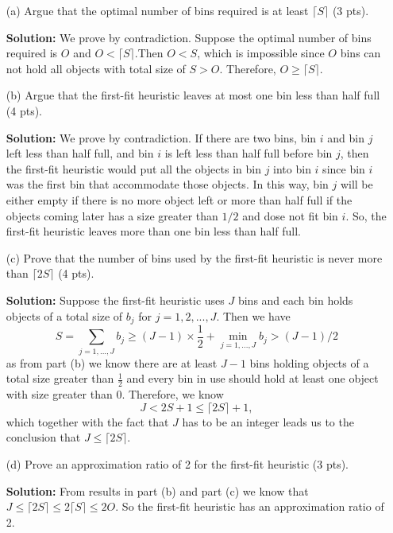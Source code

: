 \documentclass{article}
\begin{document}
\begin{itemize}
\item[(a)] Argue that the optimal number of bins required is at least $\lceil S \rceil$ (3 pts).
\begin{tcolorbox}
\textbf{Solution:} We prove by contradiction. Suppose the optimal number of bins required is $O$ and $O < \lceil S \rceil$.Then $O < S$, which is impossible since $O$ bins can not hold all objects with total size of $S > O$. Therefore, $O \geq \lceil S \rceil$.
\end{tcolorbox}

\item[(b)] Argue that the first-fit heuristic leaves at most one bin less than half full (4 pts).
\begin{tcolorbox}
\textbf{Solution:} We prove by contradiction. If there are two bins, bin $i$ and bin $j$ left less than half full, and bin $i$ is left less than half full before bin $j$, then the first-fit heuristic would put all the objects in bin $j$ into bin $i$ since bin $i$ was the first bin that accommodate those objects. In this way, bin $j$ will be either empty if there is no more object left or more than half full if the objects coming later has a size greater than $1/2$ and dose not fit bin $i$. So, the first-fit heuristic leaves more than one bin less than half full.
\end{tcolorbox}

\item[(c)] Prove that the number of bins used by the first-fit heuristic is never more than $\lceil 2S \rceil$ (4 pts).
\begin{tcolorbox}
\textbf{Solution:} Suppose the first-fit heuristic uses $J$ bins and each bin holds objects of a total size of $b_j$ for $j = 1, 2, ..., J $. Then we have $$S = \sum_{j = 1, ..., J}b_j \geq (J-1)\times \frac 1 2 + \min_{j = 1, ..., J}b_j > (J-1)/ 2$$ as from part (b) we know there are at least $J-1$ bins holding objects of a total size greater than $\frac 1 2$ and every bin in use should hold at least one object with size greater than 0. Therefore, we know $$J < 2S + 1 \leq \lceil 2S \rceil + 1,$$ 
which together with the fact that $J$ has to be an integer leads us to the conclusion that $J \leq \lceil 2S \rceil$.
\end{tcolorbox}

\item[(d)] Prove an approximation ratio of 2 for the first-fit heuristic (3 pts).
\begin{tcolorbox}
\textbf{Solution:} From results in part (b) and part (c) we know that $J \leq \lceil 2S \rceil \leq 2 \lceil S \rceil \leq 2 O$. So the first-fit heuristic has an approximation ratio of 2.
\end{tcolorbox}
\end{itemize}
\end{document}
